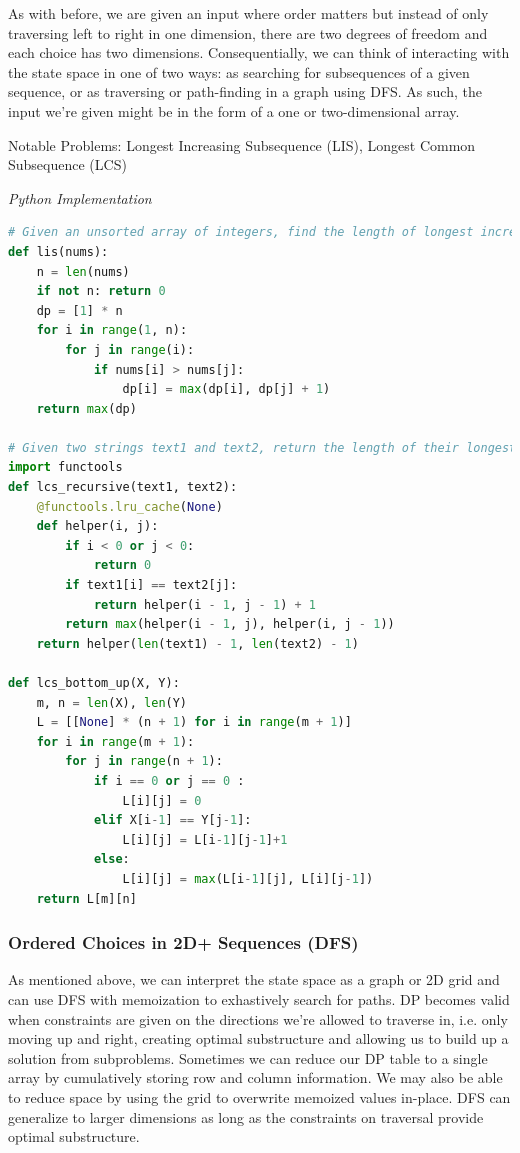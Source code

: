 \documentclass{article}
\newcommand{\comment}[1]{}
\begin{document}
\comment{
Search or Count Subsequences.

Optimize Sortable Compatible Subproblems
- Increased dimensions correspond to job scheduling problems
}
As with before, we are given an input where order matters but instead of only traversing left to right in one dimension, there are two degrees of freedom and each choice has two dimensions. Consequentially, we can think of interacting with the state space in one of two ways: as searching for subsequences of a given sequence, or as traversing or path-finding in a graph using DFS. As such, the input we're given might be in the form of a one or two-dimensional array.  

Notable Problems: Longest Increasing Subsequence (LIS), Longest Common Subsequence (LCS)

\vspace{8pt} \emph{Python Implementation}
\begin{lstlisting}[language=Python]
# Given an unsorted array of integers, find the length of longest increasing subsequence.
def lis(nums):
    n = len(nums)
    if not n: return 0
    dp = [1] * n
    for i in range(1, n):
        for j in range(i):
            if nums[i] > nums[j]:
                dp[i] = max(dp[i], dp[j] + 1)
    return max(dp)

# Given two strings text1 and text2, return the length of their longest common subsequence.
import functools
def lcs_recursive(text1, text2):
    @functools.lru_cache(None)
    def helper(i, j):
        if i < 0 or j < 0:
            return 0
        if text1[i] == text2[j]:
            return helper(i - 1, j - 1) + 1
        return max(helper(i - 1, j), helper(i, j - 1))
    return helper(len(text1) - 1, len(text2) - 1)

def lcs_bottom_up(X, Y): 
    m, n = len(X), len(Y)
    L = [[None] * (n + 1) for i in range(m + 1)] 
    for i in range(m + 1): 
        for j in range(n + 1): 
            if i == 0 or j == 0 : 
                L[i][j] = 0
            elif X[i-1] == Y[j-1]: 
                L[i][j] = L[i-1][j-1]+1
            else:
                L[i][j] = max(L[i-1][j], L[i][j-1]) 
    return L[m][n] 
\end{lstlisting}

\subsubsection*{Ordered Choices in 2D+ Sequences (DFS)}

As mentioned above, we can interpret the state space as a graph or 2D grid and can use DFS with memoization to exhastively search for paths. DP becomes valid when constraints are given on the directions we're allowed to traverse in, i.e. only moving up and right, creating optimal substructure and allowing us to build up a solution from subproblems. Sometimes we can reduce our DP table to a single array by cumulatively storing row and column information. We may also be able to reduce space by using the grid to overwrite memoized values in-place. DFS can generalize to larger dimensions as long as the constraints on traversal provide optimal substructure.
\end{document}
